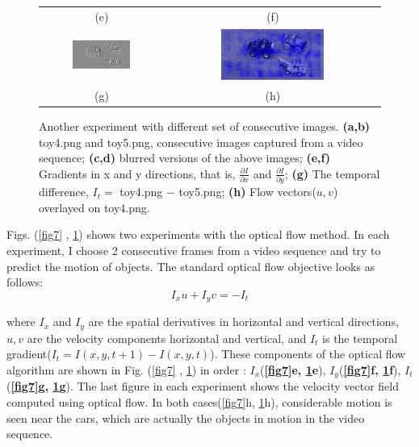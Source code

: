 \documentclass[11pt]{article}
\begin{document}
\begin{figure}[!hbt]
\begin{tabular}{cc}
  (e) & (f)  \\
  \includegraphics[width=0.5\textwidth]{../Et4-5.png} &
  \includegraphics[width=0.5\textwidth]{../car4-5_lk.png} \\
  (g) & (h) \\
 \end{tabular}
 \vspace{-10pt}
 \caption{ Another experiment with different set of consecutive images. {\bf (a,b)} toy4.png and toy5.png, consecutive images captured from a video sequence; {\bf (c,d)} blurred versions of the above images; {\bf (e,f)} Gradients in x and y directions, that is, $\frac{\partial I}{\partial x}$ and $\frac{\partial I}{\partial y}$; {\bf (g)} The temporal difference, $I_t = $ toy4.png $-$ toy5.png; {\bf (h)} Flow vectors($u,v$) overlayed on toy4.png.}
 \label{fig8}
\end{figure}

Figs. (\ref{fig7} , \ref{fig8}) shows two experiments with the optical flow method. In each experiment, I choose 2 consecutive frames from a video sequence and try to predict the motion of objects. The standard optical flow objective looks as follows:
\vspace{-5pt}
$$ I_x u + I_y v = - I_t$$ 

where $I_x$ and $I_y$ are the spatial derivatives in horizontal and vertical directions, $u,v$ are the velocity components horizontal and vertical, and $I_t$ is the temporal gradient($I_t = I(x,y,t+1) - I(x,y,t)$). These components of the optical flow algorithm are shown in Fig. (\ref{fig7} , \ref{fig8}) in order : $I_x$({\bf \ref{fig7}e, \ref{fig8}e}), $I_y$({\bf \ref{fig7}f, \ref{fig8}f}), $I_t$({\bf \ref{fig7}g, \ref{fig8}g}). The last figure in each experiment shows the velocity vector field computed using optical flow. In both cases(\ref{fig7}h, \ref{fig8}h), considerable motion is seen near the cars, which are actually the objects in motion in the video sequence.
\end{document}

